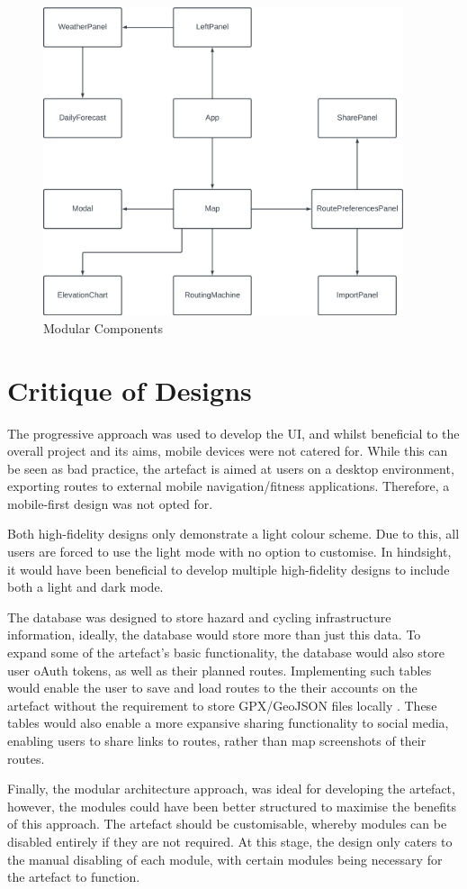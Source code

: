 \begin{figure}[!ht]
  \centering
  \includegraphics[width=400px]{figures/components.png}
  \caption{Modular Components}
  \label{fig:components}
\end{figure}

\clearpage
\section{Critique of Designs}
\label{design:critique}

The progressive approach was used to develop the UI, and whilst beneficial to the overall project and its aims, mobile devices were not catered for. While this can be seen as bad practice, the artefact is aimed at users on a desktop environment, exporting routes to external mobile navigation/fitness applications. Therefore, a mobile-first design was not opted for.

Both high-fidelity designs only demonstrate a light colour scheme. Due to this, all users are forced to use the light mode with no option to customise. In hindsight, it would have been beneficial to develop multiple high-fidelity designs to include both a light and dark mode.

The database was designed to store hazard and cycling infrastructure information, ideally, the database would store more than just this data. To expand some of the artefact's basic functionality, the database would also store user oAuth tokens, as well as their planned routes. Implementing such tables would enable the user to save and load routes to the their accounts on the artefact without the requirement to store GPX/GeoJSON files locally . These tables would also enable a more expansive sharing functionality to social media, enabling users to share links to routes, rather than map screenshots of their routes.

Finally, the modular architecture approach, was ideal for developing the artefact, however, the modules could have been better structured to maximise the benefits of this approach. The artefact should be customisable, whereby modules can be disabled entirely if they are not required. At this stage, the design only caters to the manual disabling of each module, with certain modules being necessary for the artefact to function.
